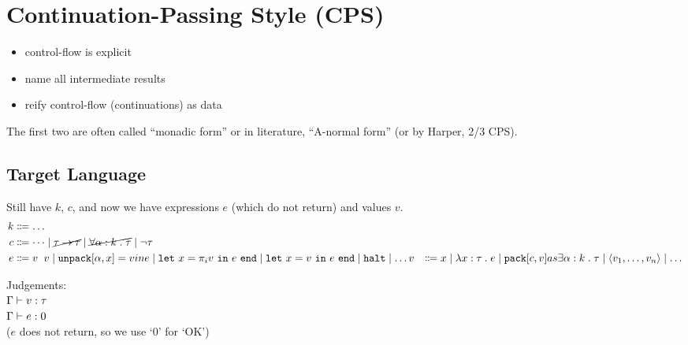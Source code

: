 \newpage
\section{Continuation-Passing Style (CPS)}
\begin{itemize}
\item control-flow is explicit
\item name all intermediate results
\item reify control-flow (continuations) as data
\end{itemize}
The first two are often called ``monadic form'' or in literature,
``A-normal form'' (or by Harper, 2/3 CPS).


\subsection{Target Language}
Still have $k$, $c$, and now we have expressions $e$ (which do not return)
and values $v$. \\
\begin{align*}
k & \bnfdef \dots \\
c & \bnfdef \dots \bnfalt \cancel{\tau \arrow \tau}
    \bnfalt \cancel{\forall\bind{\alpha \of k}{\tau}}
    \bnfalt \neg\tau \\
e & \bnfdef \ap{v}{v} \bnfalt \texttt{\unpack} [\alpha,x] = v in e
    \bnfalt \letbind{x}{\pi_i v}{e}
    \bnfalt \letbind{x}{v}{e}
    \bnfalt \texttt{halt}
    \bnfalt \dots
v & \bnfdef x \bnfalt \lambda\bind{x \of \tau}{e}
    \bnfalt \texttt{pack} [c,v] as \exists\bind{\alpha \of k}{\tau}
    \bnfalt \langle v_1, \dots, v_n \rangle
    \bnfalt \dots \\
\end{align*}

Judgements: \\
$\Gamma \vdash v \mathrel{:} \tau$ \\
$\Gamma \vdash e \mathrel{:} 0$ \\
($e$ does not return, so we use `0' for `OK')

